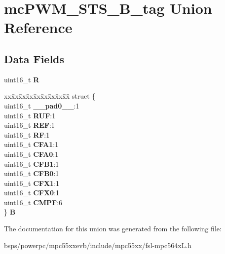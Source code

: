 \hypertarget{unionmcPWM__STS__16B__tag}{}\section{mc\+P\+W\+M\+\_\+\+S\+T\+S\+\_\+B\+\_\+tag Union Reference}
\label{unionmcPWM__STS__16B__tag}
\subsection*{Data Fields}
\begin{DoxyCompactItemize}
\item 
\mbox{\label{unionmcPWM__STS__16B__tag_a2e246c445690da6e4b21ec65516877e6}} 
uint16\+\_\+t {\bfseries R}
\item 
\mbox{\label{unionmcPWM__STS__16B__tag_a05dff6daee2d5587e095b1c82632885f}} 
\begin{tabbing}
xx\=xx\=xx\=xx\=xx\=xx\=xx\=xx\=xx\=\kill
struct \{\\
\>uint16\_t {\bfseries \_\_pad0\_\_}:1\\
\>uint16\_t {\bfseries RUF}:1\\
\>uint16\_t {\bfseries REF}:1\\
\>uint16\_t {\bfseries RF}:1\\
\>uint16\_t {\bfseries CFA1}:1\\
\>uint16\_t {\bfseries CFA0}:1\\
\>uint16\_t {\bfseries CFB1}:1\\
\>uint16\_t {\bfseries CFB0}:1\\
\>uint16\_t {\bfseries CFX1}:1\\
\>uint16\_t {\bfseries CFX0}:1\\
\>uint16\_t {\bfseries CMPF}:6\\
\} {\bfseries B}\\

\end{tabbing}\end{DoxyCompactItemize}


The documentation for this union was generated from the following file\+:\begin{DoxyCompactItemize}
\item 
bsps/powerpc/mpc55xxevb/include/mpc55xx/fsl-\/mpc564x\+L.\+h\end{DoxyCompactItemize}
